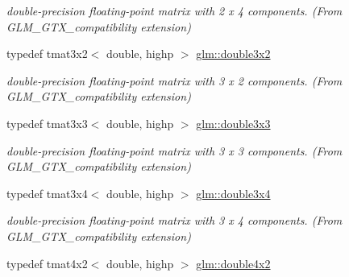 \begin{DoxyCompactItemize}
\begin{DoxyCompactList}\small\item\em double-\/precision floating-\/point matrix with 2 x 4 components. (From G\-L\-M\-\_\-\-G\-T\-X\-\_\-compatibility extension) \end{DoxyCompactList}\item 
\hypertarget{group__gtx__compatibility_ga00e4b55452fdffa224a68ead4edffa5a}{typedef tmat3x2$<$ double, highp $>$ \hyperlink{group__gtx__compatibility_ga00e4b55452fdffa224a68ead4edffa5a}{glm\-::double3x2}}\label{group__gtx__compatibility_ga00e4b55452fdffa224a68ead4edffa5a}

\begin{DoxyCompactList}\small\item\em double-\/precision floating-\/point matrix with 3 x 2 components. (From G\-L\-M\-\_\-\-G\-T\-X\-\_\-compatibility extension) \end{DoxyCompactList}\item 
\hypertarget{group__gtx__compatibility_ga3bcec888e1dca957b39c2213b740ff21}{typedef tmat3x3$<$ double, highp $>$ \hyperlink{group__gtx__compatibility_ga3bcec888e1dca957b39c2213b740ff21}{glm\-::double3x3}}\label{group__gtx__compatibility_ga3bcec888e1dca957b39c2213b740ff21}

\begin{DoxyCompactList}\small\item\em double-\/precision floating-\/point matrix with 3 x 3 components. (From G\-L\-M\-\_\-\-G\-T\-X\-\_\-compatibility extension) \end{DoxyCompactList}\item 
\hypertarget{group__gtx__compatibility_gaa30d4862bab3c5aa40225105a06b62cc}{typedef tmat3x4$<$ double, highp $>$ \hyperlink{group__gtx__compatibility_gaa30d4862bab3c5aa40225105a06b62cc}{glm\-::double3x4}}\label{group__gtx__compatibility_gaa30d4862bab3c5aa40225105a06b62cc}

\begin{DoxyCompactList}\small\item\em double-\/precision floating-\/point matrix with 3 x 4 components. (From G\-L\-M\-\_\-\-G\-T\-X\-\_\-compatibility extension) \end{DoxyCompactList}\item 
\hypertarget{group__gtx__compatibility_ga66ee22fb774d38f1484670c1afa230da}{typedef tmat4x2$<$ double, highp $>$ \hyperlink{group__gtx__compatibility_ga66ee22fb774d38f1484670c1afa230da}{glm\-::double4x2}}\label{group__gtx__compatibility_ga66ee22fb774d38f1484670c1afa230da}


\end{DoxyCompactItemize}
